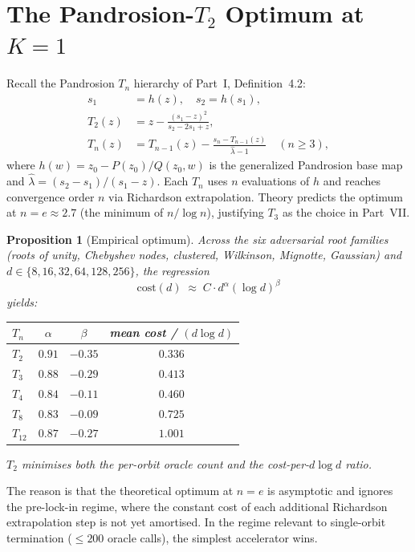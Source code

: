 \documentclass[11pt,a4paper]{article}
\newtheorem{proposition}[theorem]{Proposition}
\begin{document}
\section{The Pandrosion-$T_2$ Optimum at $K = 1$}

Recall the Pandrosion $T_n$ hierarchy of Part~I, Definition~4.2:
\begin{align*}
s_1 &= h(z), \quad s_2 = h(s_1), \\
T_2(z) &= z - \frac{(s_1 - z)^2}{s_2 - 2 s_1 + z}, \\
T_n(z) &= T_{n-1}(z) - \frac{s_n - T_{n-1}(z)}{\hat\lambda - 1} \quad (n \ge 3),
\end{align*}
where $h(w) = z_0 - P(z_0)/Q(z_0, w)$ is the generalized Pandrosion base map and $\hat\lambda = (s_2 - s_1)/(s_1 - z)$. Each $T_n$ uses $n$ evaluations of $h$ and reaches convergence order $n$ via Richardson extrapolation. Theory predicts the optimum at $n = e \approx 2.7$ (the minimum of $n / \log n$), justifying $T_3$ as the choice in Part~VII.

\begin{proposition}[Empirical optimum]\label{prop:T2}
Across the six adversarial root families (roots of unity, Chebyshev nodes, clustered, Wilkinson, Mignotte, Gaussian) and $d \in \{8, 16, 32, 64, 128, 256\}$, the regression
$$ \mathrm{cost}(d) \;\approx\; C \cdot d^{\alpha} (\log d)^{\beta} $$
yields:
\begin{center}
\begin{tabular}{lccc}
\toprule
$T_n$ & $\alpha$ & $\beta$ & mean cost / $(d \log d)$ \\
\midrule
$T_2$  & $0.91$  & $-0.35$ & $\mathbf{0.336}$ \\
$T_3$  & $0.88$  & $-0.29$ & $0.413$ \\
$T_4$  & $0.84$  & $-0.11$ & $0.460$ \\
$T_8$  & $0.83$  & $-0.09$ & $0.725$ \\
$T_{12}$ & $0.87$ & $-0.27$ & $1.001$ \\
\bottomrule
\end{tabular}
\end{center}
$T_2$ minimises both the per-orbit oracle count and the cost-per-$d \log d$ ratio.
\end{proposition}

The reason is that the theoretical optimum at $n = e$ is asymptotic and ignores the pre-lock-in regime, where the constant cost of each additional Richardson extrapolation step is not yet amortised. In the regime relevant to single-orbit termination ($\le 200$ oracle calls), the simplest accelerator wins.
\end{document}

